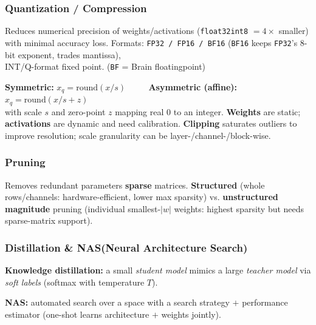 \subsubsection{Quantization / Compression} 
Reduces numerical precision of weights/activations
(\texttt{float32}\textrightarrow{}\texttt{int8} $=4\times$ smaller) with minimal accuracy loss. 
Formats: \texttt{FP32 / FP16 / BF16} (\texttt{BF16} keeps \texttt{FP32}'s 8-bit exponent, trades mantissa),\\ INT/Q-format fixed point. (\texttt{BF} = Brain floatingpoint)
\begin{outline}
  \1 \textbf{Symmetric:} $x_q=\text{round}(x/s)$ $\qquad$ \textbf{Asymmetric (affine):} $x_q=\text{round}(x/s+z)$ \\with scale $s$ and zero-point $z$ mapping real $0$ to an integer.
  \1 \textbf{Weights} are static; \textbf{activations} are dynamic and need calibration.
  \1 \textbf{Clipping} saturates outliers to improve resolution; scale granularity can be layer-/channel-/block-wise.
\end{outline}

\subsubsection{Pruning}
Removes redundant parameters \textrightarrow{} \textbf{sparse} matrices. 
\textbf{Structured} (whole rows/channels: hardware-efficient, lower max sparsity) vs.
\textbf{unstructured magnitude} pruning (individual smallest-$|w|$ weights: highest sparsity but needs sparse-matrix support).

\subsubsection{Distillation \& NAS(Neural Architecture Search)} 
\textbf{Knowledge distillation:} a small \emph{student model} mimics a large \emph{teacher model} via \emph{soft labels} (softmax with temperature $T$).

\textbf{NAS:} 
automated search over a space with a search strategy $+$ performance estimator (one-shot learns architecture $+$ weights jointly).

